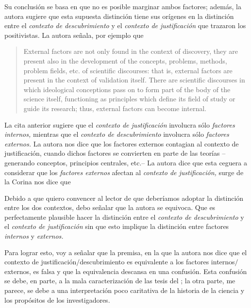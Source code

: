 Su conclusión se basa en que no es posible marginar ambos factores; además, la autora sugiere que esta supuesta distinción tiene sus orígenes en la distinción entre el \emph{contexto de descubrimiento} y el \emph{contexto de justificación} que trazaron los positivistas.
La autora señala, por ejemplo que

	\begin{quote}

	External factors are not only found in the context of discovery, they are present also in the development of the concepts, problems, methods, problem fields, etc. of scientific discourses: that is, external factors are present in the context of validation itself.
	There are scientific discourses in which ideological conceptions pass on to form part of the body of the science itself, functioning as principles which define its field of study or guide its research; thus, external factors can become internal. \parencite[p. 85]{Yturbe1995}

	\end{quote}

La cita anterior sugiere que el \emph{contexto de justificación} involucra sólo \emph{factores internos,} mientras que el \emph{contexto de descubrimiento} involucra sólo \emph{factores externos.}
La autora nos dice que los factores externos contagian al contexto de justificación, cuando dichos factores se convierten en parte de las teorías --generando conceptos, principios centrales, etc.--
La autora dice que esta ceguera a considerar que los \emph{factores externos} afectan al \emph{contexto de justificación,} surge de la 
Corina nos dice que  \parencite[p. 75]{Yturbe1995}

Debido a que quiero convencer al lector de que deberíamos adoptar la distinción entre los dos contextos, debo señalar que la autora se equivoca.
Que es perfectamente plausible hacer la distinción entre el \emph{contexto de descubrimiento} y el \emph{contexto de justificación} sin que esto implique la distinción entre factores \emph{internos} y \emph{externos.}

Para lograr esto, voy a señalar que la premisa, en la que la autora nos dice que el contexto de justificación$/$descubrimiento es equivalente a los factores internos$/$externos, es falsa y que la equivalencia descansa en una confusión.
Esta confusión se debe, en parte, a la mala caracterización de las tesis del ; la otra parte, me parece, se debe a una interpretación poco caritativa de la historia de la ciencia y los propósitos de los investigadores.

